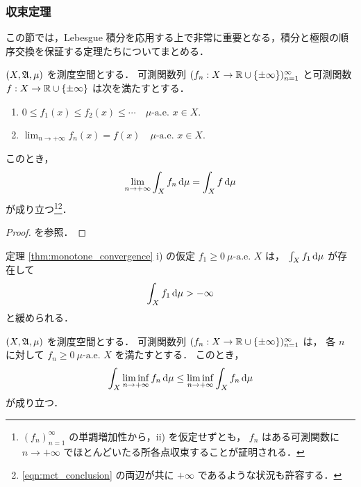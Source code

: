 \subsubsection{収束定理}

この節では，Lebesgue 積分を応用する上で非常に重要となる，積分と極限の順序交換を保証する定理たちについてまとめる．

\begin{theorem}[単調収束定理]\label{thm:monotone_convergence}
    $(X,\mathfrak{A},\mu)$ を測度空間とする．
    可測関数列 $(f_n:X\to\mathbb{R}\cup\{\pm\infty\})_{n=1}^\infty$ と可測関数 $f:X\to\mathbb{R}\cup\{\pm\infty\}$ は次を満たすとする．
    \begin{enumerate}
        \item $0\le f_1(x)\le f_2(x)\le\cdots\quad\text{$\mu$-a.e.\ $x\in X$}.$
        \item $\displaystyle\lim_{n\to+\infty}f_n(x)=f(x)\quad\text{$\mu$-a.e.\ $x\in X$}$.
    \end{enumerate}
    このとき，
    \begin{align}
        \lim_{n\to+\infty}\int_Xf_n\,\mathrm{d}\mu=\int_Xf\,\mathrm{d}\mu
        \label{eqn:mct_conclusion}
    \end{align}
    が成り立つ\footnote{
        $(f_n)_{n=1}^\infty$ の単調増加性から，\textrm{ii)} を仮定せずとも，
        $f_n$ はある可測関数に $n\to+\infty$ でほとんどいたる所各点収束することが証明される．
    }\footnote{\eqref{eqn:mct_conclusion} の両辺が共に $+\infty$ であるような状況も許容する．}．
\end{theorem}

\begin{proof}
    \cite[定理 13.2]{It63} を参照．
\end{proof}

\begin{remark}
    定理 \ref{thm:monotone_convergence} \textrm{i)} の仮定 $f_1\ge0\ \text{$\mu$-a.e.\ $X$}$ は，
    $\int_Xf_1\,\mathrm{d}\mu$ が存在して
    \begin{align*}
        \int_Xf_1\,\mathrm{d}\mu>-\infty
    \end{align*}
    と緩められる．
\end{remark}

\begin{lemma}\label{lem:Fatou}
    $(X,\mathfrak{A},\mu)$ を測度空間とする．
    可測関数列 $(f_n:X\to\mathbb{R}\cup\{\pm\infty\})_{n=1}^\infty$ は，
    各 $n$ に対して $f_n\ge0\ \text{$\mu$-a.e.\ $X$}$ を満たすとする．
    このとき，
    \begin{align*}
        \int_X\liminf_{n\to+\infty}f_n\,\mathrm{d}\mu\le\liminf_{n\to+\infty}\int_Xf_n\,\mathrm{d}\mu
    \end{align*}
    が成り立つ．
\end{lemma}

